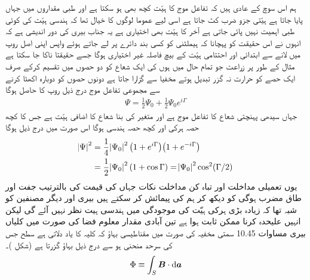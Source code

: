  ہم اس سوچ کے عادی ہیں کہ تفاعل موج کا ہیّت کچھ بھی ہو سکتا ہے اور طبی مقداروں میں جہاں  پایا جاتا ہے ہیّتی جزو ضرب کٹ جاتا ہے اسی لیے عموما لوگوں کا خیال تھا کہ ہندسی ہیّت کی کوئی طبی اہمیت نہیں پائی جاتی ہے آخر  کا ہیّت بھی اختیاری ہے یہ جناب بیری کی دور اندیشی ہے کہ انہوں نے اس حقیقت کو پہچانا کہ ہيملٹنی کو کسی بند دائرے پر لے جاتے ہوئے واپس اپنی اصل روپ میں لانے سے ابتدائی اور احتتامی  ہیّت کے بیچ فاصلہ غیر اختیاری ہوگا جسے حقیقتا ناکا جا سکتا ہے مثال کے طور پر زراعت جو تمام حال  میں ہوں کی ایک شعاع کو دو حصوں میں تقسیم کرکے صرف ایک حصے کو حرارت نہ گزر تبدیل ہوتے مخفیا سے گزارا جاتا ہے دونوں حصوں کو دوبارہ اکھٹا کرنے سے مجموعی تفاعل موج درج ذیل روپ کا حاصل ہوگا 
\begin{align}
\Psi = \frac{1}{2} \Psi_0 + \frac{1}{2} \Psi_0 e^{i \Gamma}
\end{align}
جہاں سیدھی پہنچتی شعاع کا تفاعل موج  ہے اور متغیر  کی بنا شعاع کا اضافی ہیّت  ہے جس کا کچھ حصہ ہرکی اور کچھ حصہ ہندسی ہوگا اس صورت میں درج ذیل ہوگا 
\begin{align}
\abs{\Psi}^2 &= \frac{1}{4} \abs{\Psi_0}^2 \big ( 1 + e^{i \Gamma} \big ) \big ( 1 + e^{- i \Gamma} \big ) \\
&= \frac{1}{2} \abs{\Psi_0}^2 (1 + \cos \Gamma) = \abs{\Psi_0}^2 \cos^2 (\Gamma/2)
\end{align}
یوں تعمیلی مداخلت اور تباہ کن مداخلت نکات جہاں  کی قیمت  کی بالترتیب جفت اور طاق مضرب ہوگی کو دیکھ کر ہم  کی پیمائش کر سکتے ہیں بیری اور دیگر مصنفین کو شبہ تھا کہ زیادہ بڑی ہرکی ہیّت کی موجودگی میں ہندسی ہيت نظر نہیں آئے گی لیکن انہیں علیحدہ کرنا ممکن ثابت ہوا ہے تین آبادی مقدار معلوم فضا  کی صورت میں کلیاں بیری مساوات 10.45 سمتی مخفیہ  کی صورت میں مقناطیسی بہاؤ کہ کلیہ کا یاد دلاتی ہے سطح  جس کی سرحد منحنی  ہو سے درج ذیل
 بہاؤ گزرتا ہے  (شکل )۔ 
\begin{align}
\Phi \equiv \int_S \kvec{B} \cdot \dif \kvec{a}
\end{align}


